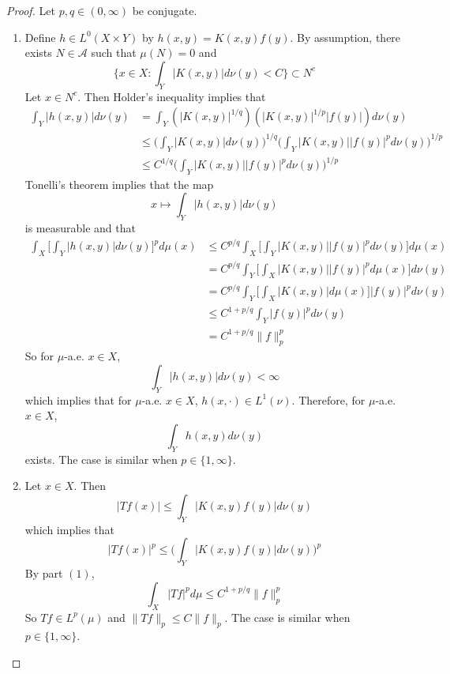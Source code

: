 \documentclass[12pt]{amsart}
\theoremstyle{definition}
\newcommand{\MA}{\mathcal{A}}
\begin{document}
	\begin{proof}Let $p,q \in (0,\infty)$ be conjugate.
	\begin{enumerate}
	\item Define $h \in L^0(X \times Y)$ by $h(x,y) = K(x, y) f(y)$. By assumption, there exists $N \in \MA$ such that $\mu(N) = 0$ and  $$\bigg \{x \in X: \int_Y |K(x, y)| d \nu(y) < C \bigg\} \subset N^c$$ 
	Let $x \in N^c$. Then Holder's inequality implies that
	\begin{align*}
	\int_Y |h(x,y)| d\nu(y) 
	&= \int_Y (|K(x,y)|^{1/q})(|K(x,y)|^{1/p}|f(y)|) d\nu(y) \\
	& \leq \bigg( \int_Y |K(x,y)| d \nu(y) \bigg)^{1/q} \bigg( \int_Y |K(x,y)||f(y)|^p d\nu(y) \bigg)^{1/p} \\
	& \leq C^{1/q} \bigg( \int_Y |K(x,y)||f(y)|^p d\nu(y) \bigg)^{1/p}
	\end{align*}
	Tonelli's theorem implies that the map $$x \mapsto \int_Y |h(x,y)| d\nu(y) $$ is measurable and that  
	\begin{align*}
	\int_X \bigg[ \int_Y |h(x,y)| d\nu(y) \bigg]^p d\mu(x) 
	&\leq  C^{p/q}  \int_X \bigg[ \int_Y |K(x,y)||f(y)|^p d\nu(y) \bigg] d\mu(x) \\
	&= C^{p/q}  \int_Y \bigg[ \int_X |K(x,y)||f(y)|^p d\mu(x) \bigg] d\nu(y) \\
	&= C^{p/q}  \int_Y \bigg[ \int_X |K(x,y)| d\mu(x) \bigg] |f(y)|^p d\nu(y) \\
	& \leq C^{1 + p/q} \int_Y |f(y)|^p  d\nu(y) \\
	& = C^{1 + p/q} \|f\|_p^p
	\end{align*}
	So for $\mu$-a.e. $x \in X$, $$\int_Y |h(x,y)| d\nu(y) < \infty$$ which implies that for $\mu$-a.e. $x \in X$, $h(x, \cdot) \in L^1(\nu)$. Therefore, for $\mu$-a.e. $x \in X$, $$\int_Y h(x,y) d\nu(y)$$ exists. The case is similar when $p \in \{1, \infty\}$.
	\item Let $x \in X$. Then $$|Tf(x)| \leq \int_Y |K(x,y)f(y)| d \nu(y)$$ which implies that $$|Tf(x)|^p \leq \bigg( \int_Y |K(x,y)f(y)| d \nu(y) \bigg)^p$$
	By part $(1)$, $$\int_X |Tf|^p d\mu \leq C^{1+p/q}\|f\|_p^p$$ 
	So $Tf \in L^p(\mu)$ and $\|Tf\|_p \leq C\|f\|_p$.
	The case is similar when $p \in \{1, \infty\}$.
	\end{enumerate}
	\end{proof}
	
	
	
	
	
	
	

	
	
\end{document}
